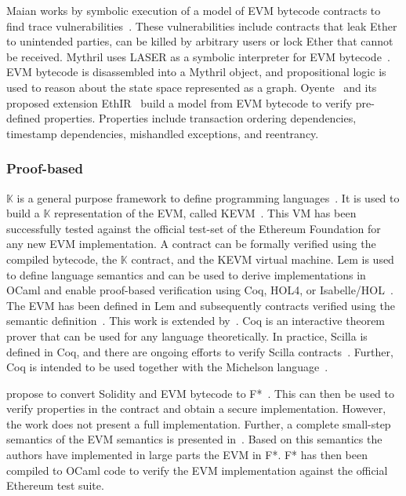 Maian works by symbolic execution of a model of EVM bytecode contracts to find trace vulnerabilities~\cite{Nikolic2018}. These vulnerabilities include contracts that leak Ether to unintended parties, can be killed by arbitrary users or lock Ether that cannot be received.
Mythril uses LASER as a symbolic interpreter for EVM bytecode~\cite{Mueller2018}. EVM bytecode is disassembled into a Mythril object, and propositional logic is used to reason about the state space represented as a graph. 
Oyente~\cite{Luu2016} and its proposed extension EthIR~\cite{Albert2018} build a model from EVM bytecode to verify pre-defined properties. Properties include transaction ordering dependencies, timestamp dependencies, mishandled exceptions, and reentrancy.

\subsubsection{Proof-based}
$\mathbb{K}$ is a general purpose framework to define programming languages~\cite{Rosu2007}. It is used to build a $\mathbb{K}$ representation of the EVM, called KEVM~\cite{Hildenbrandt2017}. 
This VM has been successfully tested against the official test-set of the Ethereum Foundation for any new EVM implementation. 
A contract can be formally verified using the compiled bytecode, the $\mathbb{K}$ contract, and the KEVM virtual machine. 
Lem is used to define language semantics and can be used to derive implementations in OCaml and enable proof-based verification using Coq, HOL4, or Isabelle/HOL~\cite{Mulligan2014}. The EVM has been defined in Lem and subsequently contracts verified using the semantic definition~\cite{Hirai2017}. This work is extended by~\cite{Amani2018}. 
Coq is an interactive theorem prover that can be used for any language theoretically. In practice, Scilla is defined in Coq, and there are ongoing efforts to verify Scilla contracts~\cite{Sergey2018}. Further, Coq is intended to be used together with the Michelson language~\cite{DynamicLedgerSolutions2017}.

\citeauthor{Bhargavan2016} propose to convert Solidity and EVM bytecode to F*~\cite{Bhargavan2016}. This can then be used to verify properties in the contract and obtain a secure implementation. However, the work does not present a full implementation.
Further, a complete small-step semantics of the EVM semantics is presented in~\cite{Grishchenko2018}. Based on this semantics the authors have implemented in large parts the EVM in F*. F* has then been compiled to OCaml code to verify the EVM implementation against the official Ethereum test suite.

